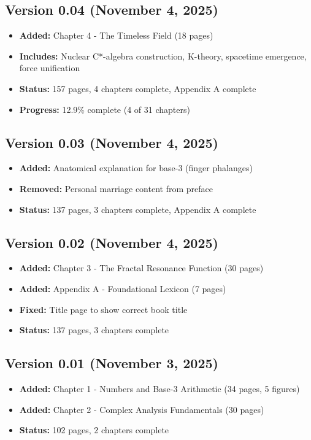 \subsection*{Version 0.04 (November 4, 2025)}
\begin{itemize}
\item \textbf{Added:} Chapter 4 - The Timeless Field (18 pages)
\item \textbf{Includes:} Nuclear C*-algebra construction, K-theory, spacetime emergence, force unification
\item \textbf{Status:} 157 pages, 4 chapters complete, Appendix A complete
\item \textbf{Progress:} 12.9\% complete (4 of 31 chapters)
\end{itemize}

\subsection*{Version 0.03 (November 4, 2025)}
\begin{itemize}
\item \textbf{Added:} Anatomical explanation for base-3 (finger phalanges)
\item \textbf{Removed:} Personal marriage content from preface
\item \textbf{Status:} 137 pages, 3 chapters complete, Appendix A complete
\end{itemize}

\subsection*{Version 0.02 (November 4, 2025)}
\begin{itemize}
\item \textbf{Added:} Chapter 3 - The Fractal Resonance Function (30 pages)
\item \textbf{Added:} Appendix A - Foundational Lexicon (7 pages)
\item \textbf{Fixed:} Title page to show correct book title
\item \textbf{Status:} 137 pages, 3 chapters complete
\end{itemize}

\subsection*{Version 0.01 (November 3, 2025)}
\begin{itemize}
\item \textbf{Added:} Chapter 1 - Numbers and Base-3 Arithmetic (34 pages, 5 figures)
\item \textbf{Added:} Chapter 2 - Complex Analysis Fundamentals (30 pages)
\item \textbf{Status:} 102 pages, 2 chapters complete
\end{itemize}

